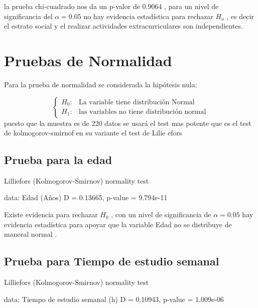 \documentclass[
  man]{apa6}
\begin{document}
la prueba chi-cuadrado nos da un p-valor de 0.9064 , para un nivel de
significancia del \(\alpha =0.05\) no hay evidencia estadística para
rechazar \(H_o\) , es decir el estrato social y el realizar actividades
extracurriculares son independientes.

\clearpage

\hypertarget{pruebas-de-normalidad}{%
\section{Pruebas de Normalidad}\label{pruebas-de-normalidad}}

Para la prueba de normalidad se considerada la hipótesis nula:

\[
\left\{
\begin{array}{ll}
H_{0}: &  \text{La variable tiene distribución Normal}\\
H_{1}: & \text{las variables no tiene distribución normal}
\end{array}
\right.
\]
puesto que la muestra es de 220 datos se usará el test mas potente
que es el test de kolmogorov-smirnof en su variante el test de Lilie
efors

\hypertarget{prueba-para-la-edad}{%
\subsection{Prueba para la edad}\label{prueba-para-la-edad}}

\begin{center}


    Lilliefors (Kolmogorov-Smirnov) normality test

data:  Edad (Años)
D = 0.13665, p-value = 9.794e-11
\end{center}

Existe evidencia para rechazar \(H_0\) , con un nivel de significancia de
\(\alpha=0.05\) hay evidencia estadística para apoyar que la variable Edad
no se distribuye de maneral normal .

\hypertarget{prueba-para-tiempo-de-estudio-semanal}{%
\subsection{Prueba para Tiempo de estudio semanal}\label{prueba-para-tiempo-de-estudio-semanal}}

\begin{center}


    Lilliefors (Kolmogorov-Smirnov) normality test

data:  Tiempo de estudio semanal (h)
D = 0.10943, p-value = 1.009e-06
\end{center}
\end{document}
